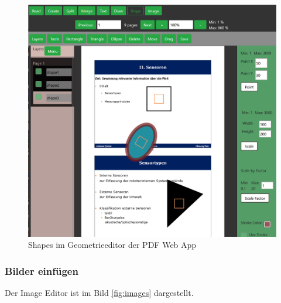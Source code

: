 \begin{figure}[!htbp]
	\centering
	\includegraphics[width=1\textwidth]{"images/shaping.png"}
	\caption{Shapes im Geometrieeditor der PDF Web App}
	\label{fig:shaping}
\end{figure}


\subsubsection{Bilder einfügen}
Der Image Editor ist im Bild \ref{fig:images} dargestellt. 

